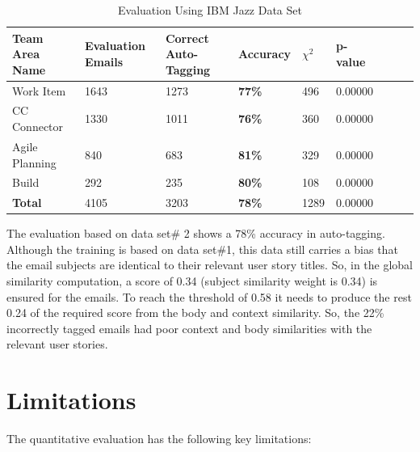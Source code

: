 \begin{table}[h!]
  \centering
  \caption{Evaluation Using IBM Jazz Data Set}
	\label{tab:jazz_evaluation}
    \begin{tabular}{|p{2cm}|p{2cm}|p{3cm}|p{2cm}|p{2cm}|p{2cm}|p{2cm}|p{2cm}|p{2cm}}
      \hline
      \textbf{Team Area Name} & \textbf{Evaluation Emails} & \textbf{Correct Auto-Tagging} & \textbf{Accuracy}	& \textbf{$\chi^2$} & \textbf{p-value}\\
      \hline
      Work Item 				& 1643 	 	&	1273 & \textbf{77\%} & 496	& 0.00000\\
      \hline
      CC Connector 			& 1330 			&	1011	& \textbf{76\%} & 360	& 0.00000\\
      \hline
      Agile Planning 		& 840 		 	& 683		& \textbf{81\%} & 329	& 0.00000\\
   		\hline
      Build 						& 292 			&	235		& \textbf{80\%} & 108	& 0.00000\\
      \hline
      \textbf{Total} 		& 4105 				& 3203 	& \textbf{78\%} & 1289	& 0.00000\\
      \hline
    \end{tabular}
\end{table}

The evaluation based on data set\# 2 shows a 78\% accuracy in auto-tagging. Although the training is based on data set\#1, this data still carries a bias that the email subjects are identical to their relevant user story titles. So, in the global similarity computation, a score of 0.34 (subject similarity weight is 0.34) is ensured for the emails. To reach the threshold of 0.58 it needs to produce the rest 0.24 of the required score from the body and context similarity. So, the 22\% incorrectly tagged emails had poor context and body similarities with the relevant user stories.

\section{Limitations}
The quantitative evaluation has the following key limitations:

